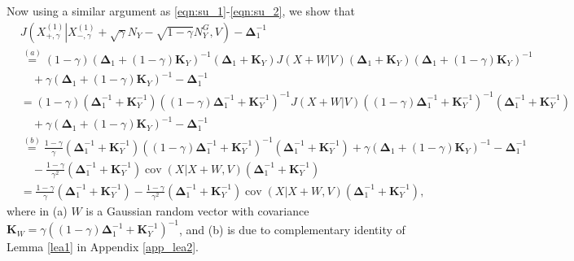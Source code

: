 \documentclass[journal,final, onecolumn]{IEEEtran}
\DeclareMathOperator{\cov}{cov}
\begin{document}
Now using a similar argument as \eqref{eqn:su_1}-\eqref{eqn:su_2}, we show that
\begin{align}
& J \left(  \left. X^{(1)}_{+, \gamma}  \right| X^{(1)}_{-, \gamma}+\sqrt{\gamma}N_{Y} - \sqrt{1-\gamma}N_{Y}^{G}, V  \right) -\boldsymbol{\Delta}_{1}^{-1} \nonumber \\
&\overset{(a)}=(1-\gamma)\left(  \boldsymbol{\Delta}_{1} + (1-\gamma) \boldsymbol{K}_{Y}  \right)^{-1}\left(  \boldsymbol{\Delta}_{1} +  \boldsymbol{K}_{Y} \right)J (X +W|V) \left(  \boldsymbol{\Delta}_{1} +  \boldsymbol{K}_{Y}\right)\left(  \boldsymbol{\Delta}_{1} + (1-\gamma) \boldsymbol{K}_{Y}  \right)^{-1} \nonumber \\
& \quad + \gamma \left(  \boldsymbol{\Delta}_{1} + (1-\gamma) \boldsymbol{K}_{Y}  \right)^{-1} -\boldsymbol{\Delta}_{1}^{-1}\\
& = (1-\gamma)\left(  \boldsymbol{\Delta}^{-1}_{1} +  \boldsymbol{K}^{-1}_{Y} \right)\left(  (1-\gamma)\boldsymbol{\Delta}^{-1}_{1} +  \boldsymbol{K}^{-1}_{Y}  \right)^{-1}J(X+W | V)\left(  (1-\gamma)\boldsymbol{\Delta}^{-1}_{1} +  \boldsymbol{K}^{-1}_{Y}  \right)^{-1}\left(  \boldsymbol{\Delta}^{-1}_{1} +  \boldsymbol{K}^{-1}_{Y} \right) \nonumber \\
& \quad + \gamma \left(  \boldsymbol{\Delta}_{1} + (1-\gamma) \boldsymbol{K}_{Y}  \right)^{-1}-\boldsymbol{\Delta}_{1}^{-1}\\
&\overset{(b)}=\frac{1-\gamma}{\gamma}\left(  \boldsymbol{\Delta}^{-1}_{1} +  \boldsymbol{K}^{-1}_{Y} \right)\left(  (1-\gamma)\boldsymbol{\Delta}^{-1}_{1} +  \boldsymbol{K}^{-1}_{Y}  \right)^{-1}\left(  \boldsymbol{\Delta}^{-1}_{1} +  \boldsymbol{K}^{-1}_{Y} \right)+ \gamma \left(  \boldsymbol{\Delta}_{1} + (1-\gamma) \boldsymbol{K}_{Y}  \right)^{-1}-\boldsymbol{\Delta}_{1}^{-1} \nonumber \\
& \quad -\frac{1-\gamma}{\gamma^2}\left(  \boldsymbol{\Delta}^{-1}_{1} +  \boldsymbol{K}^{-1}_{Y} \right) \cov (X |X + W, V)\left(  \boldsymbol{\Delta}^{-1}_{1} +  \boldsymbol{K}^{-1}_{Y} \right)\\
&=\frac{1-\gamma}{\gamma} \left(  \boldsymbol{\Delta}^{-1}_{1} +  \boldsymbol{K}^{-1}_{Y}     \right)-\frac{1-\gamma}{\gamma^2}\left(  \boldsymbol{\Delta}^{-1}_{1} +  \boldsymbol{K}^{-1}_{Y} \right) \cov (X |X + W, V)\left(  \boldsymbol{\Delta}^{-1}_{1} +  \boldsymbol{K}^{-1}_{Y} \right),\label{eq:565}
\end{align}
where in (a) $W$ is a Gaussian random vector with covariance $\boldsymbol{K}_{W} = \gamma \left(       (1-\gamma)\boldsymbol{\Delta}_{1}^{-1} + \boldsymbol{K}_{Y}^{-1}     \right)^{-1}$, and (b) is due to complementary identity of Lemma \ref{lea1} in Appendix \ref{app_lea2}.
\end{document}
